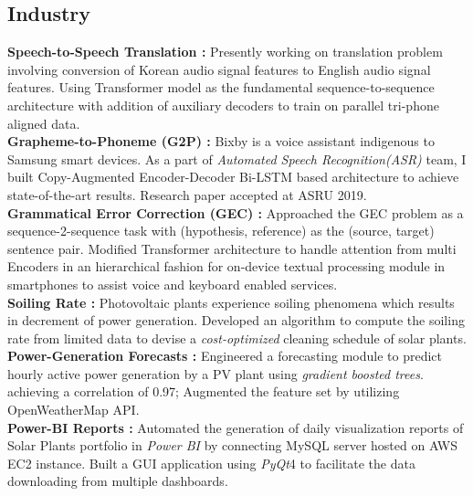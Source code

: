 \documentclass[11pt,a4paper,sans]{moderncv}        %
\begin{document}
\subsection{Industry}
{\textbf{Speech-to-Speech Translation :} Presently working on translation problem involving conversion of Korean audio signal features to English audio signal features. Using Transformer model as the fundamental sequence-to-sequence architecture with addition of auxiliary decoders to train on parallel tri-phone aligned data.
\vspace{4} \\ 
\textbf{Grapheme-to-Phoneme (G2P) :} Bixby is a voice assistant indigenous to Samsung smart devices. As a part of \textit{Automated Speech Recognition(ASR)} team, I built Copy-Augmented Encoder-Decoder Bi-LSTM based architecture to achieve state-of-the-art results. Research paper accepted at ASRU 2019.
\vspace{4} \\ 
\textbf{Grammatical Error Correction (GEC) :} Approached the GEC problem as a sequence-2-sequence task with (hypothesis, reference) as the (source, target) sentence pair. Modified Transformer architecture to handle attention from multi Encoders in an hierarchical fashion for on-device textual processing module in smartphones to assist voice and keyboard enabled services. \\}
\vspace{-2mm}
{\textbf{Soiling Rate :} Photovoltaic plants experience soiling phenomena which results in decrement of power generation. Developed an algorithm to compute the soiling rate from limited data to devise a \textit{cost-optimized} cleaning schedule of solar plants.
\vspace{4} \\ 
\textbf{Power-Generation Forecasts : }Engineered a forecasting module to predict hourly active power generation by a PV plant using \textit{gradient boosted trees}. achieving a correlation of 0.97; Augmented the feature set by utilizing OpenWeatherMap API.
\vspace{4} \\ 
\textbf{Power-BI Reports : }Automated the generation of daily visualization reports of Solar Plants portfolio in \textit{Power BI} by connecting MySQL server hosted on AWS EC2 instance. Built a GUI application using \textit{PyQt}4 to facilitate the data downloading from multiple dashboards. \\
}
\end{document}
